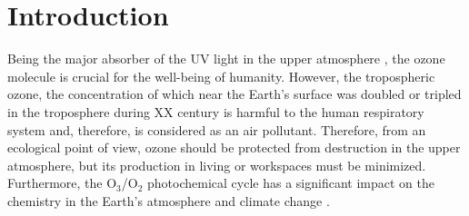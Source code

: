 \documentclass[aps,prl,twocolumn,showpacs,preprintnumbers,amsmath,amssymb,floatfix]{revtex4-2}
\begin{document}
\begin{abstract}

\end{abstract}

\maketitle


\section{\label{sec:intro}Introduction}
Being the major absorber of the UV light in the upper atmosphere \cite{orphal2016absorption}, the ozone molecule is crucial for the well-being of humanity. However, the tropospheric ozone, the concentration of which near the Earth’s surface was doubled or tripled in the troposphere during XX century \cite{IP01} is harmful to the human respiratory system and, therefore, is considered as an air pollutant. Therefore, from an ecological point of view, ozone should be protected from destruction in the upper atmosphere, but its production in living or workspaces must be minimized. Furthermore, the O$_3$/O$_2$ photochemical cycle has a significant impact on the chemistry in the Earth’s atmosphere and climate change \cite{barnes2019ozone}.
\end{document}
